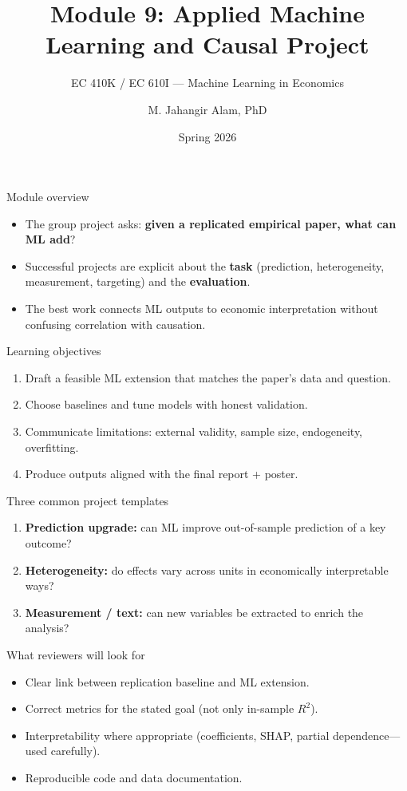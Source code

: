 \documentclass[aspectratio=169,11pt]{beamer}
\title[Applied Project]{Module 9: Applied Machine Learning and Causal Project}
\subtitle{EC 410K / EC 610I --- Machine Learning in Economics}
\author{M. Jahangir Alam, PhD}
\institute{Wilfrid Laurier University}
\date{Spring 2026}
\begin{document}
\begin{frame}[plain]
  \titlepage
\end{frame}

\begin{frame}{Module overview}
  \begin{itemize}
    \item The group project asks: \textbf{given a replicated empirical paper, what can ML add}?
    \item Successful projects are explicit about the \textbf{task} (prediction, heterogeneity, measurement, targeting) and the \textbf{evaluation}.
    \item The best work connects ML outputs to economic interpretation without confusing correlation with causation.
  \end{itemize}
\end{frame}

\begin{frame}{Learning objectives}
  \begin{enumerate}
    \item Draft a feasible ML extension that matches the paper’s data and question.
    \item Choose baselines and tune models with honest validation.
    \item Communicate limitations: external validity, sample size, endogeneity, overfitting.
    \item Produce outputs aligned with the final report + poster.
  \end{enumerate}
\end{frame}

\begin{frame}{Three common project templates}
  \begin{enumerate}
    \item \textbf{Prediction upgrade:} can ML improve out-of-sample prediction of a key outcome?
    \item \textbf{Heterogeneity:} do effects vary across units in economically interpretable ways?
    \item \textbf{Measurement / text:} can new variables be extracted to enrich the analysis?
  \end{enumerate}
\end{frame}

\begin{frame}{What reviewers will look for}
  \begin{itemize}
    \item Clear link between replication baseline and ML extension.
    \item Correct metrics for the stated goal (not only in-sample \(R^2\)).
    \item Interpretability where appropriate (coefficients, SHAP, partial dependence---used carefully).
    \item Reproducible code and data documentation.
  \end{itemize}
\end{frame}
\end{document}
